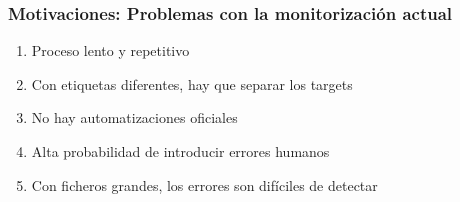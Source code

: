 \begin{frame}[label=problemas]
    \frametitle{Motivaciones: Problemas con la monitorización actual}
    \begin{enumerate}
        \item Proceso lento y repetitivo
        \item Con etiquetas diferentes, hay que separar los targets
        \item No hay automatizaciones oficiales
        \item Alta probabilidad de introducir errores humanos
        \item Con ficheros grandes, los errores son difíciles de detectar
    \end{enumerate}

    
\end{frame}